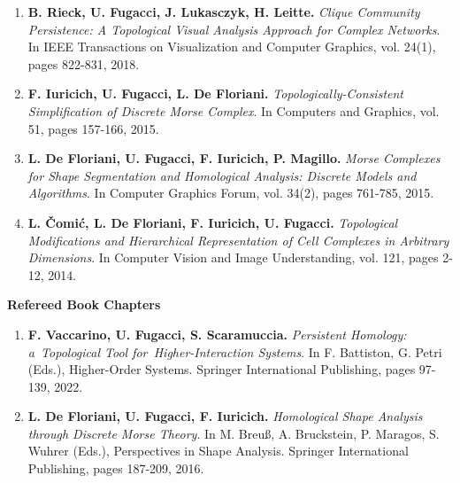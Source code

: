 \documentclass[11pt]{article}
\begin{document}
\begin{enumerate}
\item {\bf B. Rieck, U. Fugacci, J. Lukasczyk, H. Leitte.} {\em Clique Community Persistence: A Topological Visual Analysis Approach for Complex Networks}. In IEEE Transactions on Visualization and Computer Graphics, vol. 24(1), pages 822-831, 2018.

\item {\bf F. Iuricich, U. Fugacci, L. De Floriani.} {\em Topologically-Consistent Simplification of Discrete Morse Complex}. In Computers and Graphics, vol. 51, pages 157-166, 2015. %

\item {\bf L. De Floriani, U. Fugacci, F. Iuricich, P. Magillo.} {\em Morse Complexes for Shape Segmentation and Homological Analysis: Discrete Models and Algorithms}. In Computer Graphics Forum, vol. 34(2), pages 761-785, 2015.

\item {\bf L. {\v C}omi{\' c}, L. De Floriani, F. Iuricich, U. Fugacci.} {\em Topological Modifications and Hierarchical Representation of Cell Complexes in Arbitrary Dimensions}. In Computer Vision and Image Understanding, vol. 121, pages 2-12, 2014.

\end{enumerate}
\vspace*{1ex}

\noindent
{\bf Refereed Book Chapters}

\begin{enumerate}

\item {\bf F. Vaccarino, U. Fugacci, S. Scaramuccia.} {\em Persistent Homology: a Topological Tool for Higher-Interaction Systems}. In F. Battiston, G. Petri (Eds.), Higher-Order Systems. Springer International Publishing, pages 97-139, 2022.

\item {\bf L. De Floriani, U. Fugacci, F. Iuricich.} {\em Homological Shape Analysis through Discrete Morse Theory}. In M. Breu{\ss}, A. Bruckstein, P. Maragos, S. Wuhrer (Eds.), Perspectives in Shape Analysis. Springer International Publishing, pages 187-209, 2016.

\end{enumerate}
\vspace*{3ex}
\end{document}
